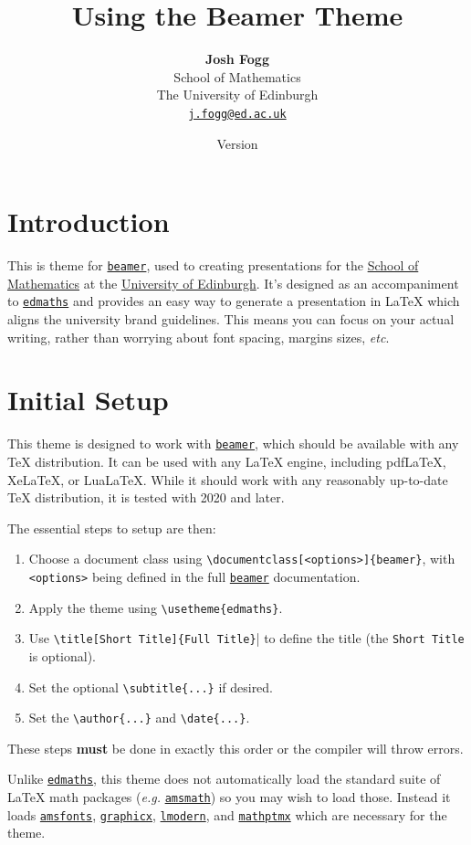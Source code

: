 \documentclass[12pt]{article}
\title{\textbf{Using the \pkg{beamertheme-edmaths} Beamer Theme}}
\author{\textbf{Josh Fogg}\\School of Mathematics\\The University of Edinburgh\\\texttt{\href{mailto:j.fogg@ed.ac.uk}{j.fogg@ed.ac.uk}}}
\date{Version \msuversion\\\msudate}
\newcommand\pkg[1]{\href{https://www.ctan.org/pkg/#1}{\color{teal}\lstinline{#1}}}
\newcommand\key[1]{{\color{orange}\lstinline|#1|}}
\begin{document}
\maketitle
\thispagestyle{empty}

\section{Introduction}

This is theme for \pkg{beamer}, used to creating presentations for the \href{https://www.maths.ed.ac.uk/}{School of Mathematics} at the \href{https://www.ed.ac.uk/}{University of Edinburgh}. It's designed as an accompaniment to \pkg{edmaths} and provides an easy way to generate a presentation in \LaTeX{} which aligns the university brand guidelines. This means you can focus on your actual writing, rather than worrying about font spacing, margins sizes, {\it etc}.

\section{Initial Setup}

This theme is designed to work with \pkg{beamer}, which should be available with any \TeX{} distribution. It can be used with any \LaTeX{} engine, including pdfLaTeX, XeLaTeX, or LuaLaTeX. While it should work with any reasonably up-to-date \TeX{} distribution, it is tested with 2020 and later.

The essential steps to setup are then:
\begin{enumerate}
    \item Choose a document class using \lstinline|\documentclass[<options>]{beamer}|, with \key{<options>} being defined in the full \pkg{beamer} documentation.
    \item Apply the theme using \lstinline|\usetheme{edmaths}|.
    \item Use \lstinline|\title[Short Title]{Full Title}|| to define the title (the \key{Short Title} is optional).
    \item Set the optional \lstinline|\subtitle{...}| if desired.
    \item Set the \lstinline|\author{...}| and \lstinline|\date{...}|.
\end{enumerate}
These steps {\bf must} be done in exactly this order or the compiler will throw errors.

Unlike \pkg{edmaths}, this theme does not automatically load the standard suite of \LaTeX{} math packages ({\it e.g.\/} \pkg{amsmath}) so you may wish to load those. Instead it loads \pkg{amsfonts}, \pkg{graphicx}, \pkg{lmodern}, and \pkg{mathptmx} which are necessary for the theme.
\end{document}
